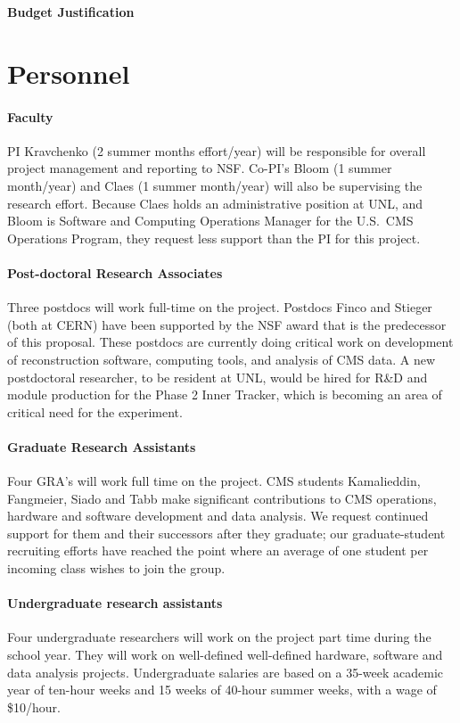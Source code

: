 \documentclass[11pt]{article}
\begin{document}
\begin{center}
{\Large \bf Budget Justification}\\
\end{center}

\section{Personnel} 

\paragraph{Faculty} PI Kravchenko (2 summer months effort/year) will be
responsible for overall project management and reporting to NSF.  Co-PI's
Bloom (1 summer month/year) and Claes (1 summer month/year) will also be supervising the research effort.  Because Claes
holds an administrative position at UNL, and Bloom is Software and
Computing Operations Manager for the U.S.~CMS Operations Program, they
request less support than the PI for this project.

\paragraph{Post-doctoral Research Associates} Three postdocs will work
full-time on the project.  Postdocs Finco and Stieger (both at CERN) have
been supported by the NSF award that is the predecessor of this proposal.
These postdocs are currently doing critical work on development of
reconstruction software, computing tools, and analysis of CMS data. A new postdoctoral researcher, to be resident at UNL, would be hired for R\&D and module production for the Phase 2 Inner Tracker, which is becoming an area of critical need for the experiment.

\paragraph{Graduate Research Assistants} Four GRA's will work full time on
the project.  CMS students Kamalieddin, Fangmeier, Siado and Tabb make
significant contributions to CMS operations, hardware and software
development and data analysis.  We request continued support for them and
their successors after they graduate; our graduate-student recruiting
efforts have reached the point where an average of one student per incoming
class wishes to join the group.

\paragraph{Undergraduate research assistants} Four undergraduate
researchers will work on the project part time during the school year.  They
will work on well-defined well-defined hardware, software and data analysis
projects.  Undergraduate salaries are based on a 35-week academic year of ten-hour weeks and 15 weeks of 40-hour summer weeks, with a wage of \$10/hour.
\end{document}

